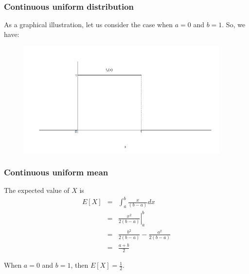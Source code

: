 \documentclass[notes=show,smaller,handout]{beamer}
\begin{document}
\begin{frame}%

\frametitle{Continuous uniform distribution}

As a graphical illustration, let us consider the case when $a=0$ and $b=1$. So, we have:%
\begin{figure}[ptb]\centering
\includegraphics[width=0.95\textwidth,height=0.75\textheight]{uniform_pdf3.pdf}%
\end{figure}%


\end{frame}%

\begin{frame}%

\frametitle{Continuous uniform mean}

The expected value of $X$ is%
\begin{eqnarray*}
E\left[ X\right] &=&\int_{a}^{b}\frac{x}{\left( b-a\right) }dx \\
&=&\left. \frac{x^{2}}{2\left( b-a\right) }\right\vert _{a}^{b} \\
&=&\frac{b^{2}}{2\left( b-a\right) }-\frac{a^{2}}{2\left( b-a\right) } \\
&=&\frac{a+b}{2}
\end{eqnarray*}

\begin{example} 
When $a=0$ and $b=1$, then $E\left[ X\right] =\frac{1}{2}$.
\end{example} 
\end{frame}%
\end{document}
